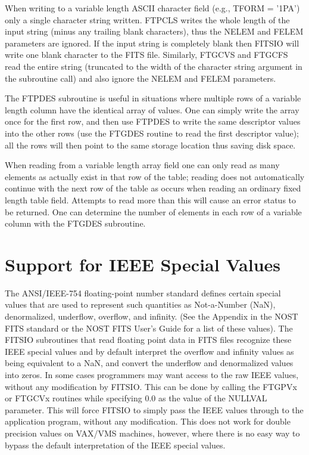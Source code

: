 \documentclass[11pt]{book}
\begin{document}
When writing to a variable length ASCII character field (e.g., TFORM =
'1PA') only a single character string written.  FTPCLS writes the whole
length of the input string (minus any trailing blank characters), thus
the NELEM and FELEM parameters are ignored.  If the input string is
completely blank then FITSIO will write one blank character to the FITS
file.  Similarly, FTGCVS and FTGCFS read the entire string (truncated
to the width of the character string argument in the subroutine call)
and also ignore the NELEM and FELEM parameters.

The FTPDES subroutine is useful in situations where multiple rows of a
variable length column have the identical array of values.  One can
simply write the array once for the first row, and then use FTPDES to
write the same descriptor values into the other rows (use the FTGDES
routine to read the first descriptor value);  all the rows will then
point to the same storage location thus saving disk space.

When reading from a variable length array field one can only read as
many elements as actually exist in that row of the table; reading does
not automatically continue with the next row of the table as occurs
when reading an ordinary fixed length table field.  Attempts to read
more than this will cause an error status to be returned.  One can
determine the number of elements in each row of a variable column with
the FTGDES subroutine.


\section{Support for IEEE Special Values}

The ANSI/IEEE-754 floating-point number standard defines certain
special values that are used to represent such quantities as
Not-a-Number (NaN), denormalized, underflow, overflow, and infinity.
(See the Appendix in the NOST FITS standard or the NOST FITS User's
Guide for a list of these values).  The FITSIO subroutines that read
floating point data in FITS files recognize these IEEE special values
and by default interpret the overflow and infinity values as being
equivalent to a NaN, and convert the underflow and denormalized values
into zeros.  In some cases programmers may want access to the raw IEEE
values, without any modification by FITSIO.  This can be done by
calling the FTGPVx or FTGCVx routines while specifying 0.0 as the value
of the NULLVAL parameter.  This will force FITSIO to simply pass the
IEEE values through to the application program, without any
modification.  This does not work for double precision values on
VAX/VMS machines, however, where there is no easy way to bypass the
default interpretation of the IEEE special values.
\end{document}

